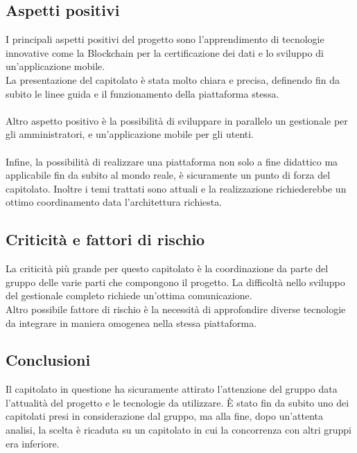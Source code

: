 \subsection{Aspetti positivi}
I principali aspetti positivi del progetto sono l'apprendimento di tecnologie innovative come la Blockchain per la certificazione dei dati e lo sviluppo di un'applicazione mobile.\\
La presentazione del capitolato è stata molto chiara e precisa, definendo fin da subito le linee guida e il funzionamento della piattaforma stessa. \\\\
Altro aspetto positivo è la possibilità di sviluppare in parallelo un gestionale per gli amministratori, e un'applicazione mobile per gli utenti.\\\\
Infine, la possibilità di realizzare una piattaforma non solo a fine didattico ma applicabile fin da subito al mondo reale, è sicuramente un punto di forza del capitolato. Inoltre i temi trattati sono attuali e la realizzazione richiederebbe un ottimo coordinamento data l'architettura richiesta.

\subsection{Criticità e fattori di rischio}
La criticità più grande per questo capitolato è la coordinazione da parte del gruppo delle varie parti che compongono il progetto. La difficoltà nello sviluppo del gestionale completo richiede un'ottima comunicazione. \\
Altro possibile fattore di rischio è la necessità di approfondire diverse tecnologie da integrare in maniera omogenea nella stessa piattaforma.

\subsection{Conclusioni}
Il capitolato in questione ha sicuramente attirato l'attenzione del gruppo data l'attualità del progetto e le tecnologie da utilizzare. È stato fin da subito uno dei capitolati presi in considerazione dal gruppo, ma alla fine, dopo un'attenta analisi, la scelta è ricaduta su un capitolato in cui la concorrenza con altri gruppi era inferiore.

\newpage